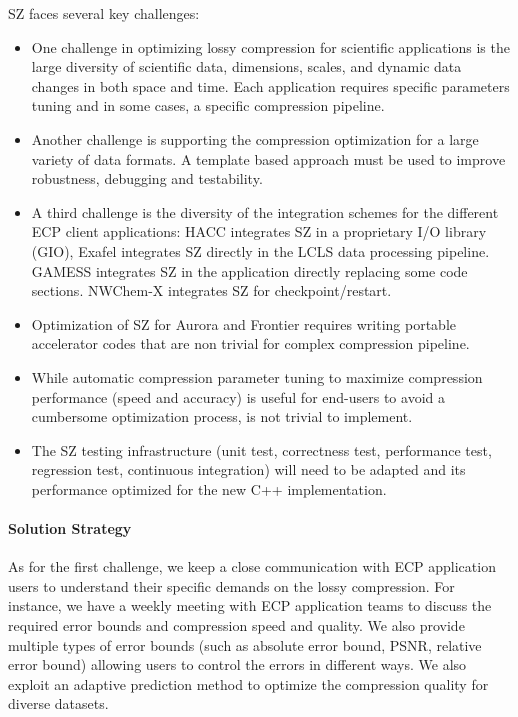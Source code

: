 SZ faces several key challenges:
\begin{itemize}
\item One challenge in optimizing lossy compression for scientific applications is the large
diversity of scientific data, dimensions, scales, and dynamic data changes in both space and time. Each application requires specific parameters tuning and in some cases, a specific compression pipeline.
\item Another challenge is supporting the compression optimization for a large variety of data formats. A template based approach must be used to improve robustness, debugging and testability.
\item A third challenge is the diversity of the integration schemes for the different ECP client applications: HACC integrates SZ in a proprietary I/O library (GIO), Exafel integrates SZ directly in the LCLS data processing pipeline. GAMESS integrates SZ in the application directly replacing some code sections. NWChem-X integrates SZ for checkpoint/restart. 
\item Optimization of SZ for Aurora and Frontier requires writing portable accelerator codes that are non trivial for complex compression pipeline. 
\item While automatic compression parameter tuning to maximize compression performance (speed and accuracy) is useful for end-users to avoid a cumbersome optimization process, is not trivial to implement. 
\item The SZ testing infrastructure (unit test, correctness test, performance test, regression test, continuous integration) will need to be adapted and its performance optimized for the new C++ implementation. 
\end{itemize}

\paragraph{Solution Strategy}

As for the first challenge, we keep a close communication with ECP application users to understand their specific demands on the lossy compression. For instance, we have a weekly meeting with ECP application teams to discuss the required error bounds and compression speed and quality. We also provide multiple types of error bounds (such as absolute error bound, PSNR, relative error bound) allowing users to control the errors in different ways. We also exploit an adaptive prediction method to optimize the compression quality for diverse datasets. 

